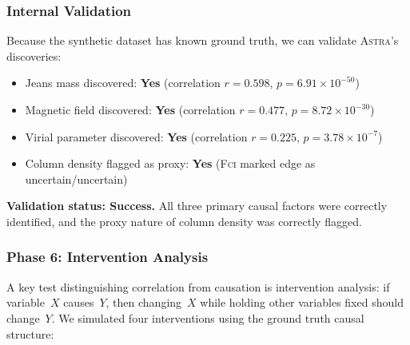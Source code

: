 \documentclass[fleqn,usenatbib]{mnras}
\newcommand{\astra}{\textsc{Astra}\xspace}
\newcommand{\fci}{\textsc{Fci}\xspace}
\begin{document}
\subsubsection{Internal Validation}
\label{sec:tc6:validation}

Because the synthetic dataset has known ground truth, we can validate \astra's discoveries:
\begin{itemize}
  \item Jeans mass discovered: \textbf{Yes} (correlation $r = 0.598$, $p = 6.91 \times 10^{-50}$)
  \item Magnetic field discovered: \textbf{Yes} (correlation $r = 0.477$, $p = 8.72 \times 10^{-30}$)
  \item Virial parameter discovered: \textbf{Yes} (correlation $r = 0.225$, $p = 3.78 \times 10^{-7}$)
  \item Column density flagged as proxy: \textbf{Yes} (\fci marked edge as uncertain/uncertain)
\end{itemize}

\textbf{Validation status: Success.}
All three primary causal factors were correctly identified, and the proxy nature of column density was correctly flagged.

\subsubsection{Phase 6: Intervention Analysis}
\label{sec:tc6:phase6}

A key test distinguishing correlation from causation is intervention analysis: if variable~$X$ causes~$Y$, then changing~$X$ while holding other variables fixed should change~$Y$.
We simulated four interventions using the ground truth causal structure:
\end{document}
